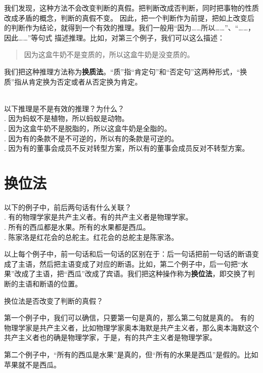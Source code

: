 我们发现，这种方法不会改变判断的真假。把判断改成否判断，同时把事物的性质改成矛盾的概念，判断的真假不变。
因此，把一个判断作为前提，把如上改变后的判断作为结论，就得到一个有效的推理。我们一般用“因为……所以……”、“……，因此……”等句式
描述推理。比如，对第三个例子，我们可以这么描述：
\begin{quotation}
    因为这盒牛奶不是变质的，所以这盒牛奶是没变质的。
\end{quotation}

我们把这种推理方法称为\textbf{换质法}。“质”指“肯定句”和“否定句”这两种形式，“换质”指从肯定换为否定或者从否定换为肯定。
\begin{xt}\label{xt:2b-0-0}
    \mbox{} \\
    以下推理是不是有效的推理？为什么？\\
    . 因为蚂蚁不是植物，所以蚂蚁是动物。 \\
    . 因为这盒牛奶不是脱脂的，所以这盒牛奶是全脂的。 \\
    . 因为有的条款不是不可逆的，所以有的条款是可逆的。 \\
    . 因为有的董事会成员不反对转型方案，所以有的董事会成员反对不转型方案。
\end{xt}

\section{换位法}
\begin{et}\label{et:2b-1-0} 
    以下的例子中，前后两句话有什么关联？\\
    . 有的物理学家是共产主义者。有的共产主义者是物理学家。\\
    . 所有的西瓜都是水果。所有的水果都是西瓜。\\
    . 陈家洛是红花会的总舵主。红花会的总舵主是陈家洛。
\end{et}
以上每个例子中，前一句话和后一句话的区别在于：后一句话把前一句话的断语变成了主语，然后把主语变成了对应的断语。比如，第二个例子中，后一句把“水果”改成了主语，把“西瓜”改成了宾语。我们把这种操作称为\textbf{换位法}，即交换了判断的主语和断语的位置。

换位法是否改变了判断的真假？

第一个例子中，我们可以确信，只要第一句是真的，那么第二句就是真的。
有的物理学家是共产主义者，比如物理学家奥本海默是共产主义者，那么奥本海默这个共产主义者也的确是物理学家，于是，有的共产主义者是物理学家。

第二个例子中，“所有的西瓜是水果”是真的，但“所有的水果是西瓜”是假的。比如苹果就不是西瓜。

